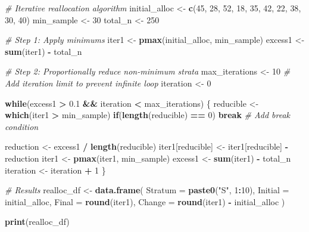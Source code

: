 \documentclass[
]{article}
\newenvironment{Shaded}{\begin{snugshade}}{\end{snugshade}}
\newcommand{\AttributeTok}[1]{\textcolor[rgb]{0.13,0.29,0.53}{#1}}
\newcommand{\CommentTok}[1]{\textcolor[rgb]{0.56,0.35,0.01}{\textit{#1}}}
\newcommand{\ControlFlowTok}[1]{\textcolor[rgb]{0.13,0.29,0.53}{\textbf{#1}}}
\newcommand{\DecValTok}[1]{\textcolor[rgb]{0.00,0.00,0.81}{#1}}
\newcommand{\FloatTok}[1]{\textcolor[rgb]{0.00,0.00,0.81}{#1}}
\newcommand{\FunctionTok}[1]{\textcolor[rgb]{0.13,0.29,0.53}{\textbf{#1}}}
\newcommand{\NormalTok}[1]{#1}
\newcommand{\OtherTok}[1]{\textcolor[rgb]{0.56,0.35,0.01}{#1}}
\newcommand{\SpecialCharTok}[1]{\textcolor[rgb]{0.81,0.36,0.00}{\textbf{#1}}}
\newcommand{\StringTok}[1]{\textcolor[rgb]{0.31,0.60,0.02}{#1}}
\begin{document}
\begin{Shaded}
\begin{Highlighting}[]
\CommentTok{\# Iterative reallocation algorithm}
\NormalTok{initial\_alloc }\OtherTok{\textless{}{-}} \FunctionTok{c}\NormalTok{(}\DecValTok{45}\NormalTok{, }\DecValTok{28}\NormalTok{, }\DecValTok{52}\NormalTok{, }\DecValTok{18}\NormalTok{, }\DecValTok{35}\NormalTok{, }\DecValTok{42}\NormalTok{, }\DecValTok{22}\NormalTok{, }\DecValTok{38}\NormalTok{, }\DecValTok{30}\NormalTok{, }\DecValTok{40}\NormalTok{)}
\NormalTok{min\_sample }\OtherTok{\textless{}{-}} \DecValTok{30}
\NormalTok{total\_n }\OtherTok{\textless{}{-}} \DecValTok{250}

\CommentTok{\# Step 1: Apply minimums}
\NormalTok{iter1 }\OtherTok{\textless{}{-}} \FunctionTok{pmax}\NormalTok{(initial\_alloc, min\_sample)}
\NormalTok{excess1 }\OtherTok{\textless{}{-}} \FunctionTok{sum}\NormalTok{(iter1) }\SpecialCharTok{{-}}\NormalTok{ total\_n}

\CommentTok{\# Step 2: Proportionally reduce non{-}minimum strata}
\NormalTok{max\_iterations }\OtherTok{\textless{}{-}} \DecValTok{10}  \CommentTok{\# Add iteration limit to prevent infinite loop}
\NormalTok{iteration }\OtherTok{\textless{}{-}} \DecValTok{0}

\ControlFlowTok{while}\NormalTok{(excess1 }\SpecialCharTok{\textgreater{}} \FloatTok{0.1} \SpecialCharTok{\&\&}\NormalTok{ iteration }\SpecialCharTok{\textless{}}\NormalTok{ max\_iterations) \{}
\NormalTok{  reducible }\OtherTok{\textless{}{-}} \FunctionTok{which}\NormalTok{(iter1 }\SpecialCharTok{\textgreater{}}\NormalTok{ min\_sample)}
  \ControlFlowTok{if}\NormalTok{(}\FunctionTok{length}\NormalTok{(reducible) }\SpecialCharTok{==} \DecValTok{0}\NormalTok{) }\ControlFlowTok{break}  \CommentTok{\# Add break condition}
  
\NormalTok{  reduction }\OtherTok{\textless{}{-}}\NormalTok{ excess1 }\SpecialCharTok{/} \FunctionTok{length}\NormalTok{(reducible)}
\NormalTok{  iter1[reducible] }\OtherTok{\textless{}{-}}\NormalTok{ iter1[reducible] }\SpecialCharTok{{-}}\NormalTok{ reduction}
\NormalTok{  iter1 }\OtherTok{\textless{}{-}} \FunctionTok{pmax}\NormalTok{(iter1, min\_sample)}
\NormalTok{  excess1 }\OtherTok{\textless{}{-}} \FunctionTok{sum}\NormalTok{(iter1) }\SpecialCharTok{{-}}\NormalTok{ total\_n}
\NormalTok{  iteration }\OtherTok{\textless{}{-}}\NormalTok{ iteration }\SpecialCharTok{+} \DecValTok{1}
\NormalTok{\}}

\CommentTok{\# Results}
\NormalTok{realloc\_df }\OtherTok{\textless{}{-}} \FunctionTok{data.frame}\NormalTok{(}
  \AttributeTok{Stratum =} \FunctionTok{paste0}\NormalTok{(}\StringTok{"S"}\NormalTok{, }\DecValTok{1}\SpecialCharTok{:}\DecValTok{10}\NormalTok{),}
  \AttributeTok{Initial =}\NormalTok{ initial\_alloc,}
  \AttributeTok{Final =} \FunctionTok{round}\NormalTok{(iter1),}
  \AttributeTok{Change =} \FunctionTok{round}\NormalTok{(iter1) }\SpecialCharTok{{-}}\NormalTok{ initial\_alloc}
\NormalTok{)}

\FunctionTok{print}\NormalTok{(realloc\_df)}
\end{Highlighting}
\end{Shaded}
\end{document}
